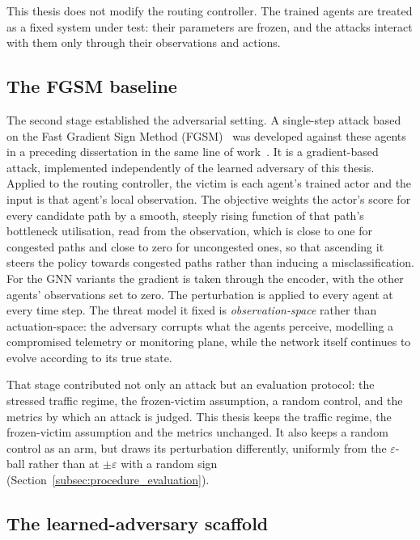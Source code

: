 This thesis does not modify the routing controller. The trained agents are treated
as a fixed system under test: their parameters are frozen, and the attacks interact with
them only through their observations and actions.
\subsection{The FGSM baseline}
\label{subsec:base_fgsm}

The second stage established the adversarial setting. A single-step attack based on
the Fast Gradient Sign Method
(FGSM)~\cite{goodfellow2015explainingharnessingadversarialexamples} was developed
against these agents in a preceding dissertation in the same line of
work~\cite{martins2026fgsm}. It is a gradient-based attack, implemented
independently of the learned adversary of this thesis. Applied to the routing
controller, the victim is each agent's trained actor and the input is that agent's local
observation. The objective weights the actor's score for every candidate path by a
smooth, steeply rising function of that path's bottleneck utilisation, read from the
observation, which is close to one for congested paths and close to zero for uncongested
ones, so that ascending it steers the policy towards congested paths rather than
inducing a misclassification. For the GNN variants the gradient is taken through the encoder, with
the other agents' observations set to zero. The perturbation is applied to every agent
at every time step. The threat model it fixed is \emph{observation-space} rather than
actuation-space: the adversary corrupts what the agents perceive, modelling a
compromised telemetry or monitoring plane, while the network itself continues to evolve
according to its true state.

That stage contributed not only an attack but an evaluation protocol: the stressed
traffic regime, the frozen-victim assumption, a random control, and the metrics by
which an attack is judged. This thesis keeps the traffic regime, the frozen-victim
assumption and the metrics unchanged. It also keeps a random control as an arm, but
draws its perturbation differently, uniformly from the $\varepsilon$-ball rather than at
$\pm\varepsilon$ with a random sign (Section~\ref{subsec:procedure_evaluation}).

\subsection{The learned-adversary scaffold}
\label{subsec:base_learned_adversary}

